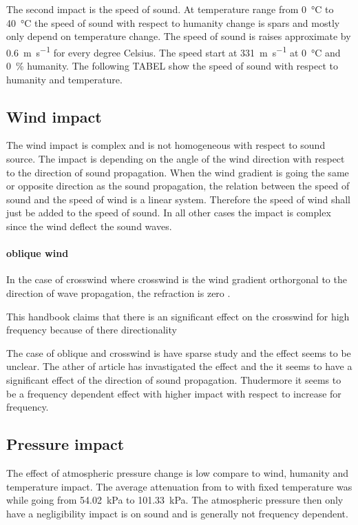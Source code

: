 The second impact is the speed of sound. At temperature range from \SI{0}{\celsius} to \SI{40}{\celsius} the speed of sound with respect to humanity change is spars and mostly only depend on temperature change. The speed of sound is raises approximate by \SI{0.6}{\meter\per\second} for every degree Celsius. The speed start at \SI{331}{\meter\per\second} at \SI{0}{\celsius} and \SI{0}{\percent} humanity. The following TABEL show the speed of sound with respect to humanity and temperature. 


\subsection{Wind impact}
The wind impact is complex and is not homogeneous with respect to sound source. The impact is depending on the angle of the wind direction with respect to the direction of sound propagation. When the wind gradient is going the same or opposite direction as the sound propagation, the relation between the speed of sound and the speed of wind is a linear system. Therefore the speed of wind shall just be added to the speed of sound. In all other cases the impact is complex since the wind deflect the sound waves.


\paragraph{oblique wind}
In the case of crosswind where crosswind is the wind gradient orthorgonal to the direction of wave propagation, the refraction is zero \citep{effect_of_wind}.

This handbook claims that there is an significant effect on the crosswind for high frequency because of there directionality \citep{BALLOU2008xi}


The case of oblique and crosswind is have sparse study and the effect seems to be unclear. The ather of article \citep{crosswind_effect_2016} has invastigated the effect and the it seems to have a significant effect of the direction of sound propagation. Thudermore it seems to be a frequency dependent effect with higher impact with respect to increase for frequency.


\subsection{Pressure impact}
The effect of atmospheric pressure change is low compare to wind, humanity and temperature impact. The average attenuation from  to  with fixed temperature was  while going from \SI{54.02}{\kilo\pascal} to \SI{101.33}{\kilo\pascal}. The atmospheric pressure then only have a negligibility impact is on sound and is generally not frequency dependent. 
 
